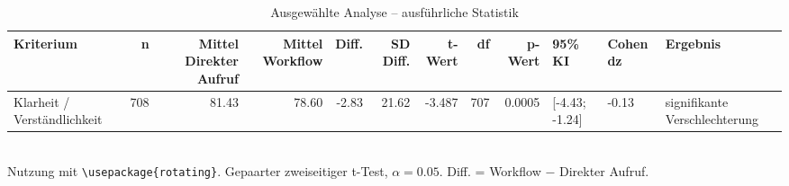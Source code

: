 \begin{table}
\centering
\caption{Ausgewählte Analyse -- ausführliche Statistik}
\begin{tabular}{lrrrrrrrrlll}
\toprule
Kriterium & n & Mittel Direkter Aufruf & Mittel Workflow & Diff. & SD Diff. & t-Wert & df & p-Wert & 95\% KI & Cohen dz & Ergebnis \\
\midrule
Klarheit / Verständlichkeit & 708 & 81.43 & 78.60 & -2.83 & 21.62 & -3.487 & 707 & 0.0005 & [-4.43; -1.24] & -0.13 & signifikante Verschlechterung \\
\bottomrule
\end{tabular}
\\[2mm]
\footnotesize Nutzung mit \texttt{\textbackslash usepackage\{rotating\}}. Gepaarter zweiseitiger t-Test, $\alpha=0.05$. Diff. = Workflow $-$ Direkter Aufruf.
\end{table}

